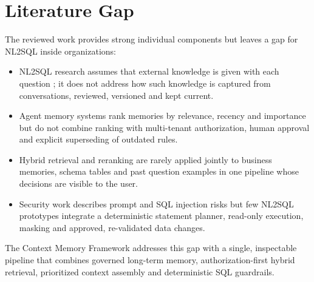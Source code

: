\section{Literature Gap}
The reviewed work provides strong individual components but leaves a gap for NL2SQL
inside organizations:
\begin{itemize}[leftmargin=*, topsep=4pt, itemsep=4pt]
    \item NL2SQL research assumes that external knowledge is given with each question
          \cite{li2023bird}; it does not address how such knowledge is captured from
          conversations, reviewed, versioned and kept current.
    \item Agent memory systems \cite{park2023generative, packer2023memgpt} rank memories by
          relevance, recency and importance but do not combine ranking with multi-tenant
          authorization, human approval and explicit superseding of outdated rules.
    \item Hybrid retrieval and reranking \cite{cormack2009rrf, nogueira2019passage} are
          rarely applied jointly to business memories, schema tables and past question
          examples in one pipeline whose decisions are visible to the user.
    \item Security work describes prompt and SQL injection risks
          \cite{greshake2023indirect, pedro2023prompt} but few NL2SQL prototypes integrate
          a deterministic statement planner, read-only execution, masking and approved,
          re-validated data changes.
\end{itemize}
The Context Memory Framework addresses this gap with a single, inspectable pipeline that
combines governed long-term memory, authorization-first hybrid retrieval, prioritized
context assembly and deterministic SQL guardrails.
